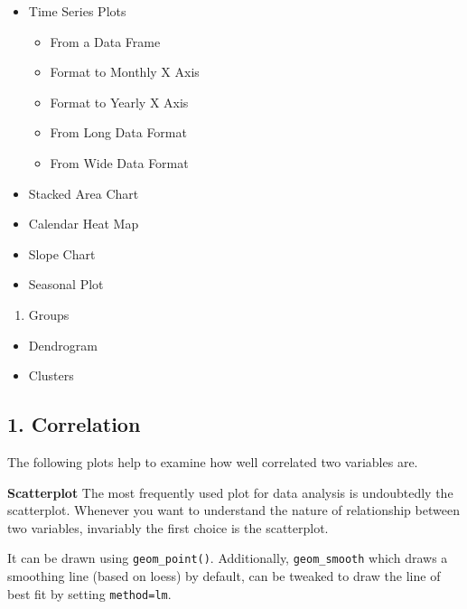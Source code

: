 \documentclass[a4paper]{article}
\providecommand{\tightlist}{%
  \setlength{\itemsep}{0pt}\setlength{\parskip}{0pt}}
\begin{document}
\begin{itemize}
\tightlist
\item
  Time Series Plots

  \begin{itemize}
  \tightlist
  \item
    From a Data Frame
  \item
    Format to Monthly X Axis
  \item
    Format to Yearly X Axis
  \item
    From Long Data Format
  \item
    From Wide Data Format
  \end{itemize}
\item
  Stacked Area Chart
\item
  Calendar Heat Map
\item
  Slope Chart
\item
  Seasonal Plot
\end{itemize}

\begin{enumerate}
\def\labelenumi{\arabic{enumi}.}
\setcounter{enumi}{6}
\tightlist
\item
  Groups
\end{enumerate}

\begin{itemize}
\tightlist
\item
  Dendrogram
\item
  Clusters
\end{itemize}

\newpage

\subsection{1. Correlation}\label{correlation}

The following plots help to examine how well correlated two variables
are.

\textbf{Scatterplot} The most frequently used plot for data analysis is
undoubtedly the scatterplot. Whenever you want to understand the nature
of relationship between two variables, invariably the first choice is
the scatterplot.

It can be drawn using \texttt{geom\_point()}. Additionally,
\texttt{geom\_smooth} which draws a smoothing line (based on loess) by
default, can be tweaked to draw the line of best fit by setting
\texttt{method=\textquotesingle{}lm\textquotesingle{}}.
\end{document}
